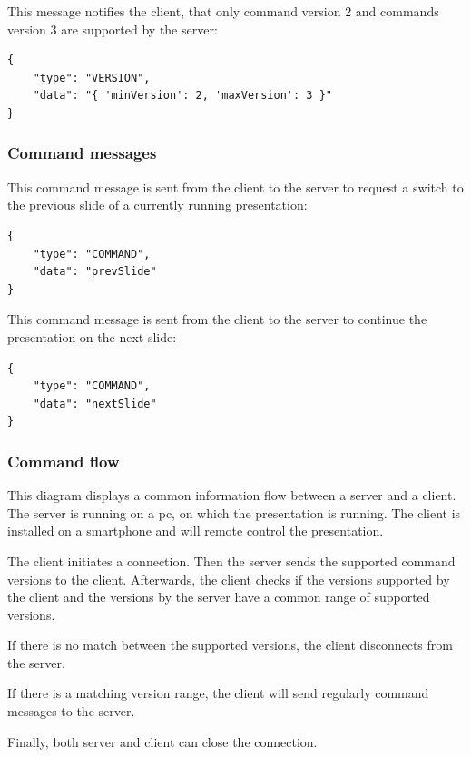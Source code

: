 \documentclass{article}
\begin{document}
This message notifies the client, that only command version 2 and commands version 3 are supported by the server:

\begin{verbatim}
{
    "type": "VERSION",
    "data": "{ 'minVersion': 2, 'maxVersion': 3 }"
}
\end{verbatim}

\newpage

\subsubsection{Command messages}

This command message is sent from the client to the server to request a switch to the previous slide of a currently running presentation:

\begin{verbatim}
{
    "type": "COMMAND",
    "data": "prevSlide"
}
\end{verbatim}

This command message is sent from the client to the server to continue the presentation on the next slide:

\begin{verbatim}
{
    "type": "COMMAND",
    "data": "nextSlide"
}
\end{verbatim}

\subsubsection{Command flow}

This diagram displays a common information flow between a server and a client.\\
The server is running on a pc, on which the presentation is running. The client is installed on a smartphone and will remote control the presentation.

The client initiates a connection. Then the server sends the supported command versions to the client. Afterwards, the client checks if the versions supported by the client and the versions by the server have a common range of supported versions.

If there is no match between the supported versions, the client disconnects from the server.

If there is a matching version range, the client will send regularly command messages to the server.

Finally, both server and client can close the connection.
\end{document}
